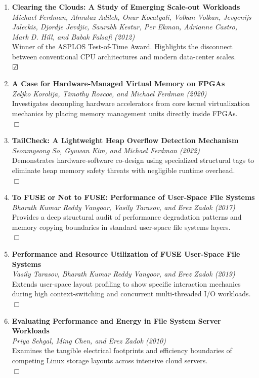\documentclass[11pt,a4paper]{article}
\begin{document}
\begin{enumerate}[resume]
    \item \textbf{Clearing the Clouds: A Study of Emerging Scale-out Workloads} \\
    \textit{Michael Ferdman, Almutaz Adileh, Onur Kocatyali, Volkan Volkan, Jevgenijs Jaleckis, Djordje Jevdjic, Saurabh Kestur, Per Ekman, Adrianne Castro, Mark D. Hill, and Babak Falsafi (2012)} \\
    Winner of the ASPLOS Test-of-Time Award. Highlights the disconnect between conventional CPU architectures and modern data-center scales. \\
    $\CheckedBox$
    
    \item \textbf{A Case for Hardware-Managed Virtual Memory on FPGAs} \\
    \textit{Zeljko Korolija, Timothy Roscoe, and Michael Ferdman (2020)} \\
    Investigates decoupling hardware accelerators from core kernel virtualization mechanics by placing memory management units directly inside FPGAs. \\
    $\Box$
    
    \item \textbf{TailCheck: A Lightweight Heap Overflow Detection Mechanism} \\
    \textit{Seonmyeong So, Gyuwan Kim, and Michael Ferdman (2022)} \\
    Demonstrates hardware-software co-design using specialized structural tags to eliminate heap memory safety threats with negligible runtime overhead. \\
    $\Box$
    
    \item \textbf{To FUSE or Not to FUSE: Performance of User-Space File Systems} \\
    \textit{Bharath Kumar Reddy Vangoor, Vasily Tarasov, and Erez Zadok (2017)} \\
    Provides a deep structural audit of performance degradation patterns and memory copying boundaries in standard user-space file systems layers. \\
    $\Box$
    
    \item \textbf{Performance and Resource Utilization of FUSE User-Space File Systems} \\
    \textit{Vasily Tarasov, Bharath Kumar Reddy Vangoor, and Erez Zadok (2019)} \\
    Extends user-space layout profiling to show specific interaction mechanics during high context-switching and concurrent multi-threaded I/O workloads. \\
    $\Box$
    
    \item \textbf{Evaluating Performance and Energy in File System Server Workloads} \\
    \textit{Priya Sehgal, Ming Chen, and Erez Zadok (2010)} \\
    Examines the tangible electrical footprints and efficiency boundaries of competing Linux storage layouts across intensive cloud servers. \\
    $\Box$
\end{enumerate}
\end{document}
